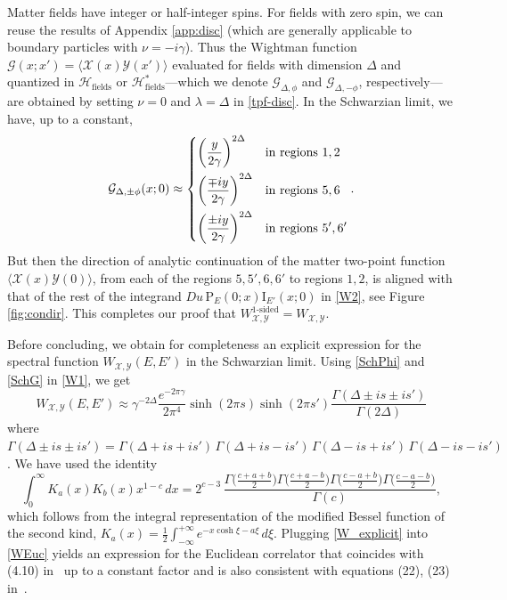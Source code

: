 \documentclass[11pt]{article}
\newcommand{\be}{\begin{equation}}
\newcommand{\ee}{\end{equation}}
\newcommand{\lt}{\left}
\newcommand{\rt}{\right}
\newcommand*{\corr}[1]{\langle{#1}\rangle}
\newcommand{\calG}{\mathcal{G}}
\newcommand{\calH}{\mathcal{H}}
\newcommand{\calX}{\mathcal{X}}
\newcommand{\calY}{\mathcal{Y}}
\newcommand{\Rho}{\mathrm{P}}
\newcommand{\Iota}{\mathrm{I}}
\newcommand{\ga}{\gamma}
\newcommand{\De}{\Delta}
\newcommand{\ov}{\over}
\begin{document}
Matter fields have integer or half-integer spins. For fields with zero spin, we can reuse the results of Appendix \ref{app:disc} (which are generally applicable to boundary particles with $\nu=-i\gamma$). Thus the Wightman function $\calG(x;x')=\corr{\calX(x)\calY(x')}$ evaluated for fields with dimension $\Delta$ and quantized in $\calH_{\text{fields}}$ or $\calH_{\text{fields}}^*$---which we denote $\calG_{\Delta, \phi}$ and $\calG_{\Delta, -\phi}$, respectively---are obtained by setting $\nu=0$ and $\lambda=\Delta$ in \eqref{tpf-disc}. In the Schwarzian limit, we have, up to a constant,
\be\label{SchG}
\calG_{\De,\pm \phi}(x;0) \approx \begin{dcases}
\lt( {y \ov 2 \ga}\rt)^{2\De} & \text{in regions $1,2$} \\
\lt( {\mp i y \ov 2 \ga}\rt)^{2\De} & \text{in regions $5,6$}\\
\lt( {\pm i y \ov 2 \ga}\rt)^{2\De} & \text{in regions $5',6'$}
\end{dcases}.
\ee
But then the direction of analytic continuation of the matter two-point function $\corr{\calX(x)\calY(0)}$, from each of the regions $5,5', 6,6'$ to regions $1,2$, is aligned with that of the rest of the integrand $Du\,\Rho_{E}(0;x)\Iota_{E'}(x;0)$ in \eqref{W2}, see Figure \ref{fig:condir}. This completes our proof that $W^{\text{1-sided}}_{\calX, \calY}=W_{\calX, \calY}$.

Before concluding, we obtain for completeness an explicit expression for the spectral function $W_{\calX, \calY}(E,E')$ in the Schwarzian limit. Using \eqref{SchPhi} and \eqref{SchG} in \eqref{W1}, we get
\begin{equation}\label{W_explicit}
W_{\calX, \calY}(E,E')\approx \gamma^{-2\Delta}\frac{e^{-2\pi\gamma}}{2\pi^4}
\sinh(2\pi s)\sinh(2\pi s')
\frac{\Gamma(\Delta\pm is\pm is')}{\Gamma(2\Delta)}
\end{equation}
where $\Gamma(\Delta\pm is\pm is') =\Gamma(\Delta+is+is')\,\Gamma(\Delta+is-is')\, \Gamma(\Delta-is+is')\,\Gamma(\Delta-is-is')$. We have used the identity
\begin{equation}
\int_{0}^{\infty}K_a(x)K_b(x)x^{1-c}\,dx =2^{c-3}\,
\frac{\Gamma\bigl(\frac{c+a+b}{2}\bigr)\Gamma\bigl(\frac{c+a-b}{2}\bigr)
\Gamma\bigl(\frac{c-a+b}{2}\bigr)\Gamma\bigl(\frac{c-a-b}{2}\bigr)}
{\Gamma(c)},
\end{equation}
which follows from the integral representation of the modified Bessel function of the second kind, $K_a(x)=\frac{1}{2}\int_{-\infty}^{+\infty}e^{-x\cosh\xi-a\xi}\,d\xi$. Plugging \eqref{W_explicit} into \eqref{WEuc} yields an expression for the Euclidean correlator that coincides with (4.10) in~\cite{MeTuVe17} up to a constant factor and is also consistent with equations (22), (23) in~\cite{BaAlKa16}.
\end{document}
